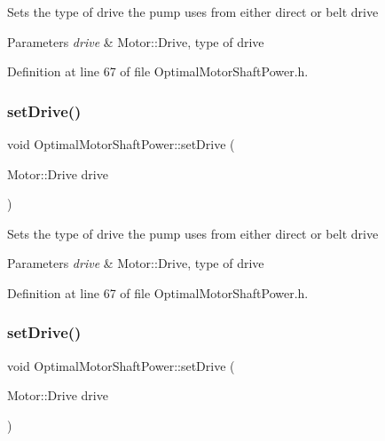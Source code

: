 Sets the type of drive the pump uses from either direct or belt drive 
\begin{DoxyParams}{Parameters}
{\em drive} & Motor\+::\+Drive, type of drive \\
\hline
\end{DoxyParams}


Definition at line 67 of file Optimal\+Motor\+Shaft\+Power.\+h.

\mbox{\label{class_optimal_motor_shaft_power_a8f3288a69848c61f4e8e2b14da549d16}} 
\subsubsection{\texorpdfstring{set\+Drive()}{setDrive()}\hspace{0.1cm}{\footnotesize\ttfamily [2/3]}}
{\footnotesize\ttfamily void Optimal\+Motor\+Shaft\+Power\+::set\+Drive (\begin{DoxyParamCaption}\item[{Motor\+::\+Drive}]{drive }\end{DoxyParamCaption})\hspace{0.3cm}{\ttfamily [inline]}}

Sets the type of drive the pump uses from either direct or belt drive 
\begin{DoxyParams}{Parameters}
{\em drive} & Motor\+::\+Drive, type of drive \\
\hline
\end{DoxyParams}


Definition at line 67 of file Optimal\+Motor\+Shaft\+Power.\+h.

\mbox{\label{class_optimal_motor_shaft_power_a8f3288a69848c61f4e8e2b14da549d16}} 
\subsubsection{\texorpdfstring{set\+Drive()}{setDrive()}\hspace{0.1cm}{\footnotesize\ttfamily [3/3]}}
{\footnotesize\ttfamily void Optimal\+Motor\+Shaft\+Power\+::set\+Drive (\begin{DoxyParamCaption}\item[{Motor\+::\+Drive}]{drive }\end{DoxyParamCaption})\hspace{0.3cm}{\ttfamily [inline]}}

